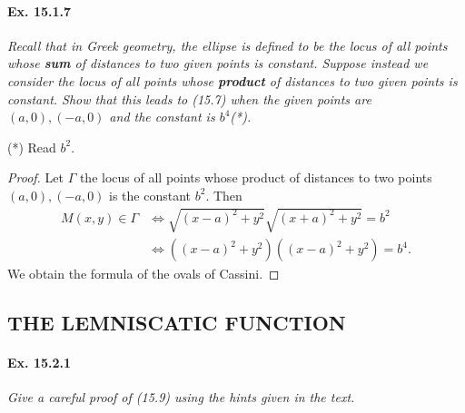 \documentclass[11pt,a4paper]{article}
\begin{document}
\paragraph{Ex. 15.1.7}{\it Recall that in Greek geometry, the ellipse is defined to be the locus of all points whose {\bf sum} of distances to two given points is constant. Suppose instead we consider the locus of all points whose {\bf product} of distances to two given points is constant. Show that this leads to (15.7) when the given points are $(a,0),(-a,0)$ and the constant is $b^4$(*).
}

(*) Read $b^2$.

\begin{proof}
Let $\Gamma$ the locus of all points whose product of distances to two points $(a,0),(-a,0)$ is the constant $b^2$. Then
\begin{align*}
M(x,y) \in \Gamma & \iff \sqrt{(x-a)^2 + y^2}   \sqrt{(x+a)^2 + y^2}  = b^2\\
&\iff ((x-a)^2 + y^2)((x-a)^2 + y^2) = b^4.
\end{align*}
We obtain the formula of the ovals of Cassini.
\end{proof}


\subsection{THE LEMNISCATIC FUNCTION}
\paragraph{Ex. 15.2.1}{\it Give a careful proof of (15.9) using the hints given in the text.
}
\end{document}
